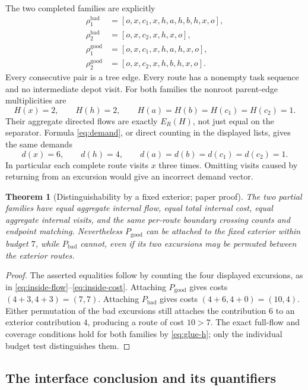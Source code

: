 \documentclass[11pt]{article}
\newtheorem{theorem}{Theorem}[section]
\theoremstyle{remark}
\begin{document}
The two completed families are explicitly
\begin{align*}
 \rho^{\mathrm{bad}}_1&=[o,x,c_1,x,h,a,h,b,h,x,o],\\
 \rho^{\mathrm{bad}}_2&=[o,x,c_2,x,h,x,o],\\
 \rho^{\mathrm{good}}_1&=[o,x,c_1,x,h,a,h,x,o],\\
 \rho^{\mathrm{good}}_2&=[o,x,c_2,x,h,b,h,x,o].
\end{align*}
Every consecutive pair is a tree edge. Every route has a nonempty task sequence and no intermediate depot visit.
For both families the nonroot parent-edge multiplicities are
\begin{equation}\label{eq:glue-h}
 H(x)=2,\qquad H(h)=2,\qquad
 H(a)=H(b)=H(c_1)=H(c_2)=1.
\end{equation}
Their aggregate directed flows are exactly $E_R(H)$, not just equal on the separator.
Formula \eqref{eq:demand}, or direct counting in the displayed lists, gives the same demands
\[
 d(x)=6,\qquad d(h)=4,\qquad d(a)=d(b)=d(c_1)=d(c_2)=1.
\]
In particular each complete route visits $x$ three times. Omitting visits caused by returning from an excursion would give an incorrect demand vector.

\begin{theorem}[Distinguishability by a fixed exterior; paper proof]\label{thm:glue}
The two partial families have equal aggregate internal flow, equal total internal cost, equal aggregate internal visits, and the same per-route boundary crossing counts and endpoint matching.
Nevertheless $P_{\mathrm{good}}$ can be attached to the fixed exterior within budget $7$, while $P_{\mathrm{bad}}$ cannot, even if its two excursions may be permuted between the exterior routes.
\end{theorem}
\begin{proof}
The asserted equalities follow by counting the four displayed excursions, as in
\eqref{eq:inside-flow}--\eqref{eq:inside-cost}.
Attaching $P_{\mathrm{good}}$ gives costs $(4+3,4+3)=(7,7)$.
Attaching $P_{\mathrm{bad}}$ gives costs $(4+6,4+0)=(10,4)$.
Either permutation of the bad excursions still attaches the contribution $6$ to an exterior contribution $4$, producing a route of cost $10>7$.
The exact full-flow and coverage conditions hold for both families by \eqref{eq:glue-h}; only the individual budget test distinguishes them.
\end{proof}

\subsection{The interface conclusion and its quantifiers}
\end{document}
